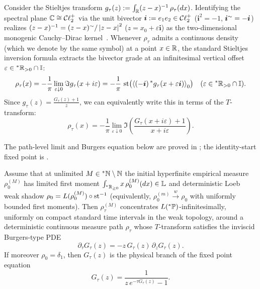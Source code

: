 \begin{remark}
\label{rem:t-transform-inversion}
Consider the Stieltjes transform $g_\tau(z) := \int_{\mathbb{R}} (z - x)^{-1}\,\rho_\tau(dx)$. Identifying the spectral plane $\mathbb{C} \cong \mathcal{C}\ell_2^+$ via the unit bivector $\bm{i} := e_1 e_2 \in \mathcal{C}\ell_2^+$ ($\bm{i}^2 = -1$, $\bm{i}^{\sim} = -\bm{i}$) realizes $(z - x)^{-1} = (z - x)^{\sim}/\left\lvert z - x \right\rvert^2$ ($z = x_0 + \varepsilon\bm{i}$) as the two-dimensional monogenic Cauchy--Dirac kernel~\cite{brackx1982clifford}. Whenever $\rho_\tau$ admits a continuous density (which we denote by the same symbol) at a point $x \in \mathbb{R}$, the standard Stieltjes inversion formula extracts the bivector grade at an infinitesimal vertical offset $\varepsilon \in {}^*\mathbb{R}_{>0} \cap \mathbb{I}$:
\begin{equation}
\label{eq:ch6-stieltjes-inv}
\rho_\tau(x) = -\frac{1}{\pi}\lim_{\varepsilon \downarrow 0} \Im g_\tau(x + i\varepsilon)
= -\frac{1}{\pi}\,\operatorname{st}\bigl(\left\langle (-\bm{i})\,{}^*g_\tau(x + \varepsilon\bm{i}) \right\rangle_0\bigr) \quad (\varepsilon \in {}^*\mathbb{R}_{>0} \cap \mathbb{I}).
\end{equation}
Since $g_\tau(z) = \frac{G_\tau(z) + 1}{z}$, we can equivalently write this in terms of the $T$-transform:
\begin{equation}
\label{eq:ch6-T-inv}
\rho_\tau(x) = -\frac{1}{\pi}\lim_{\varepsilon \downarrow 0} \Im\!\left(\frac{G_\tau(x + i\varepsilon) + 1}{x + i\varepsilon}\right).
\end{equation}
\end{remark}

The path-level limit and Burgers equation below are proved in \cite[Theorem 1.2]{li2026geometric}; the identity-start fixed point is \cite[Corollary 1.3]{li2026geometric}.

\begin{theorem}
\label{thm:burgers-fixed-point}
Assume that at unlimited $M \in {}^*\mathbb{N} \setminus \mathbb{N}$ the initial hyperfinite empirical measure $\rho_0^{(M)}$ has limited first moment $\int_{{}^*\mathbb{R}_{\ge 0}} x\,\rho_0^{(M)}(dx) \in \mathbb{L}$ and deterministic Loeb weak shadow $\rho_0 = L(\rho_0^{(M)}) \circ \operatorname{st}^{-1}$ (equivalently, $\rho_0^{(m)} \xrightarrow{w} \rho_0$ with uniformly bounded first moments). Then $\rho_\tau^{(M)}$ concentrates $L({}^*\mathbb{P})$-infinitesimally, uniformly on compact standard time intervals in the weak topology, around a deterministic continuous measure path $\rho_\tau$ whose $T$-transform satisfies the inviscid Burgers-type PDE
\begin{equation}
\label{eq:ch6-burgers-pde}
\partial_\tau G_\tau(z) = -z\,G_\tau(z)\,\partial_z G_\tau(z).
\end{equation}
If moreover $\rho_0 = \delta_1$, then $G_\tau(z)$ is the physical branch of the fixed point equation
\begin{equation}
\label{eq:ch6-fixed-point}
G_\tau(z) = \frac{1}{z\,e^{-\tau G_\tau(z)} - 1}.
\end{equation}
\end{theorem}

